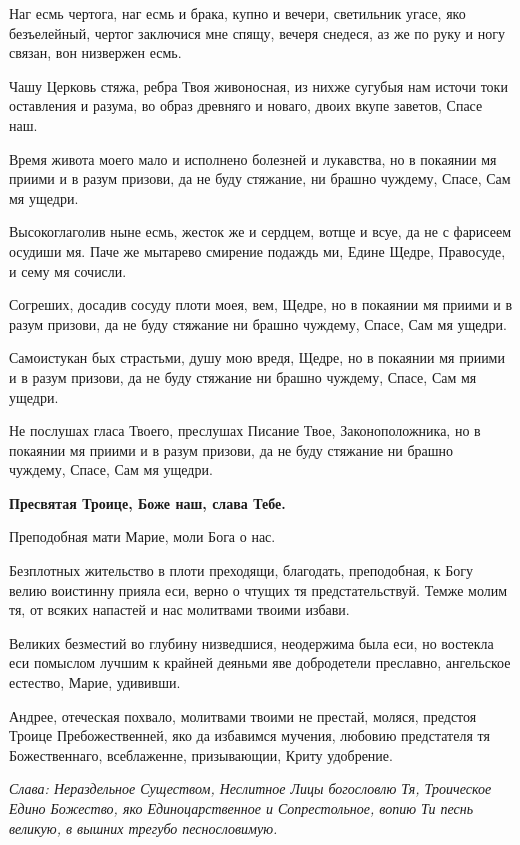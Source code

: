 Наг есмь чертога, наг есмь и брака, купно и вечери, светильник угасе, яко безъелейный, чертог заключися мне спящу, вечеря снедеся, аз же по руку и ногу связан, вон низвержен есмь.

Чашу Церковь стяжа, ребра Твоя живоносная, из нихже сугубыя нам источи токи оставления и разума, во образ древняго и новаго, двоих вкупе заветов, Спасе наш.

Время живота моего мало и исполнено болезней и лукавства, но в покаянии мя приими и в разум призови, да не буду стяжание, ни брашно чуждему, Спасе, Сам мя ущедри.

Высокоглаголив ныне есмь, жесток же и сердцем, вотще и всуе, да не с фарисеем осудиши мя. Паче же мытарево смирение подаждь ми, Едине Щедре, Правосуде, и сему мя сочисли.

Согреших, досадив сосуду плоти моея, вем, Щедре, но в покаянии мя приими и в разум призови, да не буду стяжание ни брашно чуждему, Спасе, Сам мя ущедри.

Самоистукан бых страстьми, душу мою вредя, Щедре, но в покаянии мя приими и в разум призови, да не буду стяжание ни брашно чуждему, Спасе, Сам мя ущедри.

Не послушах гласа Твоего, преслушах Писание Твое, Законоположника, но в покаянии мя приими и в разум призови, да не буду стяжание ни брашно чуждему, Спасе, Сам мя ущедри.

\bfseries Пресвятая Троице, Боже наш, слава Тебе.

Преподобная мати Марие, моли Бога о нас.\normalfont{}

Безплотных жительство в плоти преходящи, благодать, преподобная, к Богу велию воистинну прияла еси, верно о чтущих тя предстательствуй. Темже молим тя, от всяких напастей и нас молитвами твоими избави.


Великих безместий во глубину низведшися, неодержима была еси, но востекла еси помыслом лучшим к крайней деяньми яве добродетели преславно, ангельское естество, Марие, удививши.


Андрее, отеческая похвало, молитвами твоими не престай, моляся, предстоя Троице Пребожественней, яко да избавимся мучения, любовию предстателя тя Божественнаго, всеблаженне, призывающии, Криту удобрение.

\itshape Слава\normalfont{}: Нераздельное Существом, Неслитное Лицы богословлю Тя, Троическое Едино Божество, яко Единоцарственное и Сопрестольное, вопию Ти песнь великую, в вышних трегубо песнословимую.

